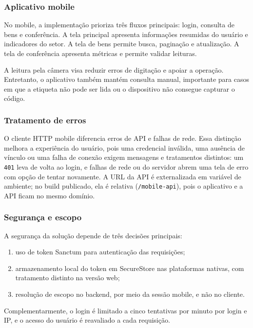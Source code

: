 \documentclass[12pt,a4paper]{article}
\begin{document}
\subsubsection{Aplicativo mobile}

No mobile, a implementação prioriza três fluxos principais: login, consulta de bens e conferência. A tela principal apresenta informações resumidas do usuário e indicadores do setor. A tela de bens permite busca, paginação e atualização. A tela de conferência apresenta métricas e permite validar leituras.

A leitura pela câmera visa reduzir erros de digitação e apoiar a operação. Entretanto, o aplicativo também mantém consulta manual, importante para casos em que a etiqueta não pode ser lida ou o dispositivo não consegue capturar o código.

\subsubsection{Tratamento de erros}

O cliente HTTP mobile diferencia erros de API e falhas de rede. Essa distinção melhora a experiência do usuário, pois uma credencial inválida, uma ausência de vínculo ou uma falha de conexão exigem mensagens e tratamentos distintos: um \texttt{401} leva de volta ao login, e falhas de rede ou do servidor abrem uma tela de erro com opção de tentar novamente. A URL da API é externalizada em variável de ambiente; no build publicado, ela é relativa (\texttt{/mobile-api}), pois o aplicativo e a API ficam no mesmo domínio.

\subsubsection{Segurança e escopo}

A segurança da solução depende de três decisões principais:

\begin{enumerate}
    \item uso de token Sanctum para autenticação das requisições;
    \item armazenamento local do token em SecureStore nas plataformas nativas, com tratamento distinto na versão web;
    \item resolução de escopo no backend, por meio da sessão mobile, e não no cliente.
\end{enumerate}

Complementarmente, o login é limitado a cinco tentativas por minuto por login e IP, e o acesso do usuário é reavaliado a cada requisição.
\end{document}
